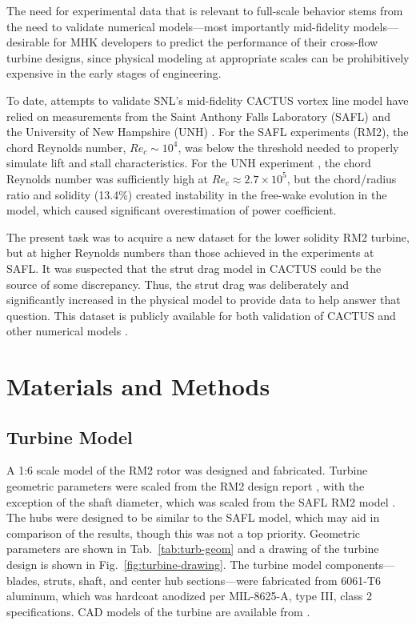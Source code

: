 \documentclass[10pt,letterpaper]{article}
\begin{document}
The need for experimental data that is relevant to full-scale behavior stems
from the need to validate numerical models---most importantly mid-fidelity
models---desirable for MHK developers to predict the performance of their
cross-flow turbine designs, since physical modeling at appropriate scales can be
prohibitively expensive in the early stages of engineering.

To date, attempts to validate SNL's mid-fidelity CACTUS vortex line model
\cite{Murray2011} have relied on measurements from the Saint Anthony Falls
Laboratory (SAFL) \cite{Hill2014} and the University of New Hampshire (UNH)
\cite{Neary2013, Michelen2014}. For the SAFL experiments (RM2), the chord
Reynolds number, $Re_c \sim 10^4$, was below the threshold needed to properly
simulate lift and stall characteristics. For the UNH experiment
\cite{Bachant2013}, the chord Reynolds number was sufficiently high at $Re_c
\approx 2.7 \times 10^5$, but the chord/radius ratio and solidity (13.4\%)
created instability in the free-wake evolution in the model, which caused
significant overestimation of power coefficient.

The present task was to acquire a new dataset for the lower solidity RM2
turbine, but at higher Reynolds numbers than those achieved in the experiments
at SAFL. It was suspected that the strut drag model in CACTUS could be the
source of some discrepancy. Thus, the strut drag was deliberately and
significantly increased in the physical model to provide data to help answer
that question. This dataset is publicly available for both validation of CACTUS
and other numerical models \cite{Bachant2015-RM2-data}.


\section*{Materials and Methods}

\subsection*{Turbine Model}


A 1:6 scale model of the RM2 rotor was designed and fabricated. Turbine
geometric parameters were scaled from the RM2 design report \cite{Barone2011},
with the exception of the shaft diameter, which was scaled from the SAFL RM2
model \cite{Hill2014}. The hubs were designed to be similar to the SAFL model,
which may aid in comparison of the results, though this was not a top priority.
Geometric parameters are shown in Tab.~\ref{tab:turb-geom} and a drawing of the
turbine design is shown in Fig.~\ref{fig:turbine-drawing}. The turbine model
components---blades, struts, shaft, and center hub sections---were fabricated
from 6061-T6 aluminum, which was hardcoat anodized per MIL-8625-A, type III,
class 2 specifications. CAD models of the turbine are available from
\cite{Bachant2015-RM2-CAD}.
\end{document}
